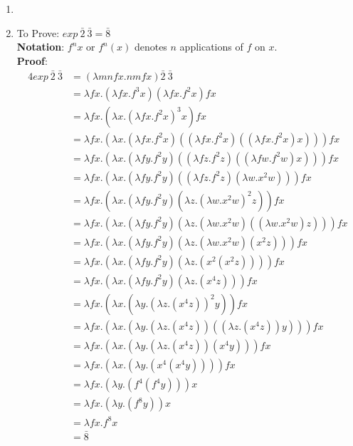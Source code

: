 \documentclass[11pt]{article}
\begin{document}
\begin{enumerate}
\begin{enumerate}
   \item     \item To Prove: $exp\:\bar{2}\:\bar{3} = \bar{8}$\\
   \textbf{Notation}: $f^n x$ or $f^n(x)$  denotes $n$ applications of $f$ on $x$.\\
          \textbf{Proof}:  \begin{alignat*}{4}
    exp\:\bar{2}\:\bar{3} &= (\lambda mnfx.nm f x)\bar{2}\:\bar{3}\\
    &= \lambda fx. (\lambda fx.f^3 x) (\lambda fx. f^2 x) fx\\
    &= \lambda fx. (\lambda x. (\lambda fx. f^2 x)^3 x) fx\\
    &= \lambda fx. ( \lambda x.   (\lambda fx. f^2 x) ((\lambda fx. f^2 x) ( (\lambda fx. f^2 x) x ))          )fx\\
        &= \lambda fx. ( \lambda x.   (\lambda fy. f^2 y) ((\lambda fz. f^2 z) ( (\lambda fw. f^2 w) x ))          )fx\\
&= \lambda fx. ( \lambda x.   (\lambda fy. f^2 y) ((\lambda fz. f^2 z) ( \lambda w. x^2 w  ))          )fx\\
&= \lambda fx. ( \lambda x.   (\lambda fy. f^2 y) 
      (\lambda z. ( \lambda w. x^2 w  )^2 z)           )fx\\
&= \lambda fx. ( \lambda x.   (\lambda fy. f^2 y) 
      (\lambda z.    ( \lambda w. x^2 w  ) (( \lambda w. x^2 w  ) z)        )           )fx\\
&= \lambda fx. ( \lambda x.   (\lambda fy. f^2 y) 
      (\lambda z.    ( \lambda w. x^2 w  ) ( x^2 z)        )           )fx\\
&= \lambda fx. ( \lambda x.   (\lambda fy. f^2 y) 
      (\lambda z.    (  x^2 ( x^2 z)  )         )           )fx\\
&= \lambda fx. ( \lambda x.   (\lambda fy. f^2 y) 
      (\lambda z.(  x^4 z))           )fx\\
&= \lambda fx. ( \lambda x.   (\lambda y. (\lambda z.(  x^4 z)) ^2 y) 
                )fx\\
&= \lambda fx. ( \lambda x.   (\lambda y. (\lambda z.(  x^4 z))((\lambda z.(  x^4 z)) y)   ) 
                )fx\\
&= \lambda fx. ( \lambda x.   (\lambda y. (\lambda z.(  x^4 z))(x^4 y)   ) 
                )fx\\
&= \lambda fx. ( \lambda x.   (\lambda y. (  x^4 (x^4 y) )  )   )   fx\\
&= \lambda fx.   (\lambda y. (  f^4 (f^4 y) )  ) x\\
&= \lambda fx.   (\lambda y. (  f^8 y )  ) x\\
&= \lambda fx.  f^8 x\\
&= \bar{8}\\
            \end{alignat*} 
\end{enumerate}
\end{enumerate}
\end{document}

